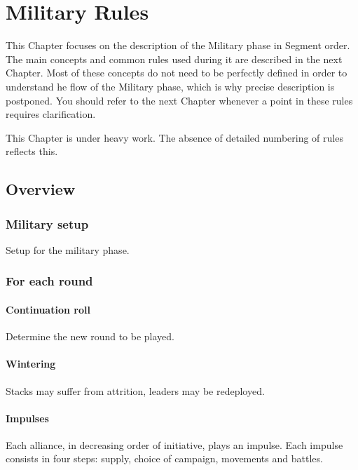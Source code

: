 
\chapter{Military Rules}\label{chapter:MilitaryRules}

\begin{designnote}
  This Chapter focuses on the description of the Military phase in
  Segment order. The main concepts and common rules used during it are
  described in the next Chapter. Most of these concepts do not need to be
  perfectly defined in order to understand he flow of the Military phase,
  which is why precise description is postponed. You should refer to the next
  Chapter whenever a point in these rules requires clarification.
\end{designnote}

\begin{todo}
  This Chapter is under heavy work. The absence of detailed numbering of rules
  reflects this.
\end{todo}

\section{Overview}
\aparag[Sequence]
\MilitaryDetailsNew

\subsection{Military setup}
Setup for the military phase.

\subsection{For each round}
\subsubsection{Continuation roll}
Determine the new round to be played.

\subsubsection{Wintering}
Stacks may suffer from attrition, leaders may be redeployed.

\subsubsection{Impulses}
Each alliance, in decreasing order of initiative, plays an impulse. Each
impulse consists in four steps: supply, choice of campaign, movements and
battles.

